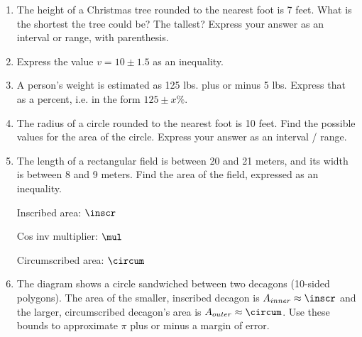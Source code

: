 \begin{enumerate}
\item The height of a Christmas tree rounded to the nearest foot is 7 feet. What is the shortest the tree could be? The tallest? Express your answer as an interval or range, with parenthesis. \vspace{1cm}

\item Express the value $v=10 \pm 1.5$ as an inequality. \vspace{1cm}

\item A person's weight is estimated as 125 lbs. plus or minus 5 lbs. Express that as a percent, i.e. in the form $125 \pm x\%$. \vspace{2cm}

\item The radius of a circle rounded to the nearest foot is 10 feet. Find the possible values for the area of the circle. Express your answer as an interval / range. \vspace{3cm}

\item The length of a rectangular field is between 20 and 21 meters, and its width is between 8 and 9 meters. Find the area of the field, expressed as an inequality.

\newpage
        Inscribed area: $\inscr$ \par
        Cos inv multiplier: $\mul$ \par
        Circumscribed area: $\circum$ \par
\item The diagram shows a circle sandwiched between two decagons (10-sided polygons). The area of the smaller, inscribed decagon is $A_{inner} \approx \inscr$ and the larger, circumscribed decagon's area is $A_{outer} \approx \circum$. Use these bounds to approximate $\pi$ plus or minus a margin of error.
\par

    

\end{enumerate}
